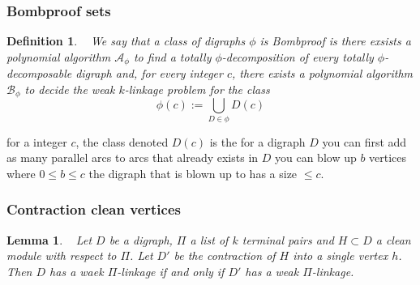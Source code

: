 \documentclass{beamer}
\newtheorem{lemma}[thm]{Lemma}
\newtheorem{definition}{Definition}[section]
\begin{document}
\begin{frame}
\frametitle{Bombproof sets}
\begin{definition}~\cite{bangJGT85}
    We say that a class of digraphs $\phi$ is Bombproof is there exsists a polynomial algorithm $\mathcal{A}_\phi$ to find a totally $\phi$-decomposition of every totally $\phi$-decomposable digraph and, for every integer $c$, there exists a polynomial algorithm  $\mathcal{B}_\phi$ to decide the weak $k$-linkage problem for the class
    \begin{equation}
        \phi(c):=\bigcup_{D\in \phi}D(c) 
    \end{equation}
\end{definition}
for a integer $c$, the class denoted $D(c)$ is the for a digraph $D$ you can first add as many parallel arcs to arcs that already exists in $D$ you can blow up $b$ vertices where $0\leq b\leq c$ the digraph that is blown up to has a size $\leq c$. 
\end{frame}

\begin{frame}
    \frametitle{Contraction clean vertices}
    \begin{lemma}~\cite{bangJGT85}
        Let $D$ be a digraph, $\Pi$ a list of $k$ terminal pairs and $H\subset D$ a clean module with respect to $\Pi$. Let $D'$ be the contraction of $H$ into a single vertex $h$. Then $D$ has a waek $\Pi$-linkage if and only if $D'$ has a weak $\Pi$-linkage.  
    \end{lemma}
\end{frame}
\end{document}
